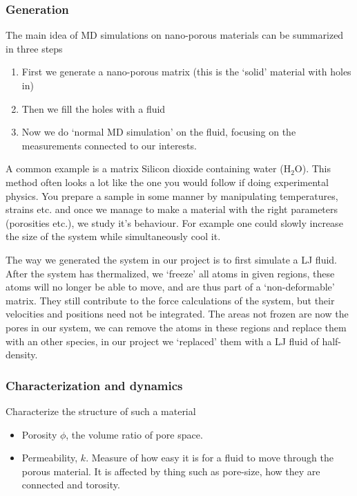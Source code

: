 \documentclass[a4paper, 11pt, notitlepage, english]{article}
\begin{document}
\subsubsection*{Generation}
The main idea of MD simulations on nano-porous materials can be summarized in three steps
\begin{enumerate}
	\item First we generate a nano-porous matrix (this is the `solid' material with holes in)
	\item Then we fill the holes with a fluid
	\item Now we do `normal MD simulation' on the fluid, focusing on the measurements connected to our interests. 
\end{enumerate}
A common example is a matrix Silicon dioxide containing water (H$_2$O). This method often looks a lot like the one you would follow if doing experimental physics. You prepare a sample in some manner by manipulating temperatures, strains etc. and once we manage to make a material with the right parameters (porosities etc.), we study it's behaviour. For example one could slowly increase the size of the system while simultaneously cool it.


The way we generated the system in our project is to first simulate a LJ fluid. After the system has thermalized, we `freeze' all atoms in given regions, these atoms will no longer be able to move, and are thus part of a `non-deformable' matrix. They still contribute to the force calculations of the system, but their velocities and positions need not be integrated. The areas not frozen are now the pores in our system, we can remove the atoms in these regions and replace them with an other species, in our project we `replaced' them with a LJ fluid of half-density.

\subsubsection*{Characterization and dynamics}

Characterize the structure of such a material
\begin{itemize}
	\item Porosity $\phi$, the volume ratio of pore space. 
	\item Permeability, $k$. Measure of how easy it is for a fluid to move through the porous material. It is affected by thing such as pore-size, how they are connected and torosity.
\end{itemize}
\end{document}

